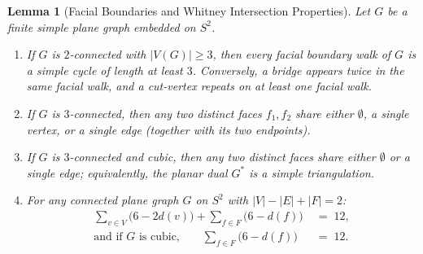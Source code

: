 \documentclass[11pt,reqno]{amsart}
\theoremstyle{plain}
\newtheorem{lemma}[theorem]{Lemma}
\theoremstyle{definition}
\theoremstyle{remark}
\DeclareRobustCommand{\_}{\ifmmode\text{\textunderscore}\else\textunderscore\allowbreak\fi}
\begin{document}
\begin{lemma}[Facial Boundaries and Whitney Intersection Properties]\label{lem:plane-basics}
Let $G$ be a finite simple plane graph embedded on $S^2$.
\begin{enumerate}[label=(\roman*),leftmargin=2.2em]
  \item If $G$ is $2$-connected with $|V(G)| \ge 3$, then every facial boundary walk of $G$ is a simple cycle of length at least $3$. Conversely, a bridge appears twice in the same facial walk, and a cut-vertex repeats on at least one facial walk.
  \item If $G$ is $3$-connected, then any two distinct faces $f_1, f_2$ share either $\emptyset$, a single vertex, or a single edge (together with its two endpoints).
  \item If $G$ is $3$-connected and cubic, then any two distinct faces share either $\emptyset$ or a single edge; equivalently, the planar dual $G^*$ is a simple triangulation.
  \item For any connected plane graph $G$ on $S^2$ with $|V| - |E| + |F| = 2$:
  \begin{align}
    \sum_{v \in V} \bigl(6 - 2 d(v)\bigr) + \sum_{f \in F} \bigl(6 - d(f)\bigr) &\;=\; 12, \label{eq:euler-vf}\\
    \text{and if $G$ is cubic,}\qquad \sum_{f \in F} \bigl(6 - d(f)\bigr) &\;=\; 12. \label{eq:euler-cubic}
  \end{align}
\end{enumerate}
\end{lemma}
\end{document}
